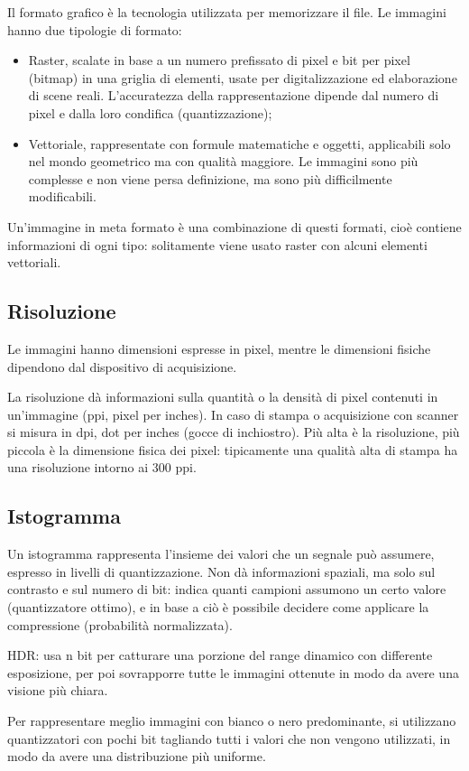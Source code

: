 Il formato grafico è la tecnologia utilizzata per memorizzare il file. Le immagini hanno due tipologie di formato: 
\begin{itemize}
	\item Raster, scalate in base a un numero prefissato di pixel e bit per pixel (bitmap) in una griglia di elementi, usate per digitalizzazione ed elaborazione di scene reali. L'accuratezza della rappresentazione dipende dal numero di pixel e dalla loro condifica (quantizzazione);
	\item Vettoriale, rappresentate con formule matematiche e oggetti, applicabili solo nel mondo geometrico ma con qualità maggiore. Le immagini sono più complesse e non viene persa definizione, ma sono più difficilmente modificabili.
\end{itemize}
Un'immagine in meta formato è una combinazione di questi formati, cioè contiene informazioni di ogni tipo: solitamente viene usato raster con alcuni elementi vettoriali.

\subsection{Risoluzione}
Le immagini hanno dimensioni espresse in pixel, mentre le dimensioni fisiche dipendono dal dispositivo di acquisizione. 

La risoluzione dà informazioni sulla quantità o la densità di pixel contenuti in un'immagine (ppi, pixel per inches). In caso di stampa o acquisizione con scanner si misura in dpi, dot per inches (gocce di inchiostro). Più alta è la risoluzione, più piccola è la dimensione fisica dei pixel: tipicamente una qualità alta di stampa ha una risoluzione intorno ai 300 ppi.

   
\subsection{Istogramma}
Un istogramma rappresenta l'insieme dei valori che un segnale può assumere, espresso in livelli di quantizzazione. Non dà informazioni spaziali, ma solo sul contrasto e sul numero di bit: indica quanti campioni assumono un certo valore (quantizzatore ottimo), e in base a ciò è possibile decidere come applicare la compressione (probabilità normalizzata).

HDR: usa n bit per catturare una porzione del range dinamico con differente esposizione, per poi sovrapporre tutte le immagini ottenute in modo da avere una visione più chiara. 

Per rappresentare meglio immagini con bianco o nero predominante, si utilizzano quantizzatori con pochi bit tagliando tutti i valori che non vengono utilizzati, in modo da avere una distribuzione più uniforme. 

